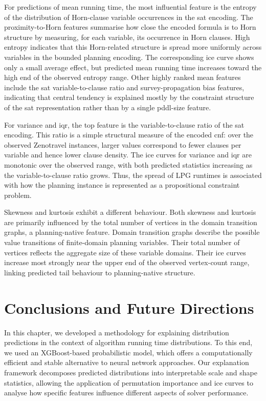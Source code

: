 For predictions of mean running time, the most influential feature is the entropy of the distribution of Horn-clause variable occurrences in the \gls{sat} encoding.
The proximity-to-Horn features summarise how close the encoded formula is to Horn structure by measuring, for each variable, its occurrence in Horn clauses.
High entropy indicates that this Horn-related structure is spread more uniformly across variables in the bounded planning encoding.
The corresponding \gls{ice} curve shows only a small average effect, but predicted mean running time increases toward the high end of the observed entropy range.
Other highly ranked mean features include the \gls{sat} variable-to-clause ratio and survey-propagation bias features, indicating that central tendency is explained mostly by the constraint structure of the \gls{sat} representation rather than by a single \gls{pddl}-size feature.

For variance and \gls{iqr}, the top feature is the variable-to-clause ratio of the \gls{sat} encoding.
This ratio is a simple structural measure of the encoded \gls{cnf}: over the observed Zenotravel instances, larger values correspond to fewer clauses per variable and hence lower clause density.
The \gls{ice} curves for variance and \gls{iqr} are monotonic over the observed range, with both predicted statistics increasing as the variable-to-clause ratio grows.
Thus, the spread of LPG runtimes is associated with how the planning instance is represented as a propositional constraint problem.

Skewness and kurtosis exhibit a different behaviour.
Both skewness and kurtosis are primarily influenced by the total number of vertices in the domain transition graphs, a planning-native feature.
Domain transition graphs describe the possible value transitions of finite-domain planning variables. Their total number of vertices reflects the aggregate size of these variable domains.
Their \gls{ice} curves increase most strongly near the upper end of the observed vertex-count range, linking predicted tail behaviour to planning-native structure.

\FloatBarrier

\section{Conclusions and Future Directions}
\label{sec:ch09:concl}

In this chapter, we developed a methodology for explaining distribution predictions in the context of algorithm running time distributions. To this end, we used an XGBoost-based probabilistic model, which offers a computationally efficient and stable alternative to neural network approaches. Our explanation framework decomposes predicted distributions into interpretable scale and shape statistics, allowing the application of permutation importance and \gls{ice} curves to analyse how specific features influence different aspects of solver performance.

